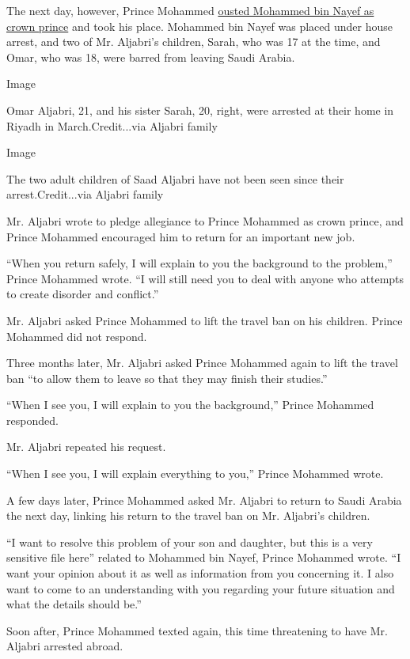 The next day, however, Prince Mohammed
\href{https://www.nytimes3xbfgragh.onion/2017/07/18/world/middleeast/saudi-arabia-mohammed-bin-nayef-mohammed-bin-salman.html}{ousted
Mohammed bin Nayef as crown prince} and took his place. Mohammed bin
Nayef was placed under house arrest, and two of Mr. Aljabri's children,
Sarah, who was 17 at the time, and Omar, who was 18, were barred from
leaving Saudi Arabia.

Image

Omar Aljabri, 21, and his sister Sarah, 20, right, were arrested at
their home in Riyadh in March.Credit...via Aljabri family

Image

The two adult children of Saad Aljabri have not been seen since their
arrest.Credit...via Aljabri family

Mr. Aljabri wrote to pledge allegiance to Prince Mohammed as crown
prince, and Prince Mohammed encouraged him to return for an important
new job.

``When you return safely, I will explain to you the background to the
problem,'' Prince Mohammed wrote. ``I will still need you to deal with
anyone who attempts to create disorder and conflict.''

Mr. Aljabri asked Prince Mohammed to lift the travel ban on his
children. Prince Mohammed did not respond.

Three months later, Mr. Aljabri asked Prince Mohammed again to lift the
travel ban ``to allow them to leave so that they may finish their
studies.''

``When I see you, I will explain to you the background,'' Prince
Mohammed responded.

Mr. Aljabri repeated his request.

``When I see you, I will explain everything to you,'' Prince Mohammed
wrote.

A few days later, Prince Mohammed asked Mr. Aljabri to return to Saudi
Arabia the next day, linking his return to the travel ban on Mr.
Aljabri's children.

``I want to resolve this problem of your son and daughter, but this is a
very sensitive file here'' related to Mohammed bin Nayef, Prince
Mohammed wrote. ``I want your opinion about it as well as information
from you concerning it. I also want to come to an understanding with you
regarding your future situation and what the details should be.''

Soon after, Prince Mohammed texted again, this time threatening to have
Mr. Aljabri arrested abroad.

